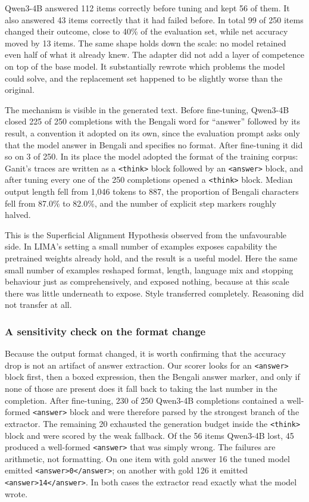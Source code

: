 Qwen3-4B answered 112 items correctly before tuning and kept 56 of them. It
also answered 43 items correctly that it had failed before. In total 99 of 250
items changed their outcome, close to 40\% of the evaluation set, while net
accuracy moved by 13 items. The same shape holds down the scale: no model
retained even half of what it already knew. The adapter did not add a layer of
competence on top of the base model. It substantially rewrote which problems
the model could solve, and the replacement set happened to be slightly worse
than the original.

The mechanism is visible in the generated text. Before fine-tuning, Qwen3-4B
closed 225 of 250 completions with the Bengali word for ``answer'' followed by
its result, a convention it adopted on its own, since the evaluation prompt
asks only that the model answer in Bengali and specifies no format. After
fine-tuning it did so on 3 of 250. In its place the model adopted the format of
the training corpus: Ganit's traces are written as a \texttt{<think>} block
followed by an \texttt{<answer>} block, and after tuning every one of the 250
completions opened a \texttt{<think>} block. Median output length fell from
1,046 tokens to 887, the proportion of Bengali characters fell from 87.0\% to
82.0\%, and the number of explicit step markers roughly halved.

This is the Superficial Alignment Hypothesis \parencite{zhou2023lima} observed
from the unfavourable side. In LIMA's setting a small number of examples
exposes capability the pretrained weights already hold, and the result is a
useful model. Here the same small number of examples reshaped format, length,
language mix and stopping behaviour just as comprehensively, and exposed
nothing, because at this scale there was little underneath to expose. Style
transferred completely. Reasoning did not transfer at all.

\subsubsection*{A sensitivity check on the format change}

Because the output format changed, it is worth confirming that the accuracy
drop is not an artifact of answer extraction. Our scorer looks for an
\texttt{<answer>} block first, then a boxed expression, then the Bengali answer
marker, and only if none of those are present does it fall back to taking the
last number in the completion. After fine-tuning, 230 of 250 Qwen3-4B
completions contained a well-formed \texttt{<answer>} block and were therefore
parsed by the strongest branch of the extractor. The remaining 20 exhausted the
generation budget inside the \texttt{<think>} block and were scored by the weak
fallback. Of the 56 items Qwen3-4B lost, 45 produced a well-formed
\texttt{<answer>} that was simply wrong. The failures are arithmetic, not
formatting. On one item with gold answer 16 the tuned model emitted
\texttt{<answer>0</answer>}; on another with gold 126 it emitted
\texttt{<answer>14</answer>}. In both cases the extractor read exactly what the
model wrote.


